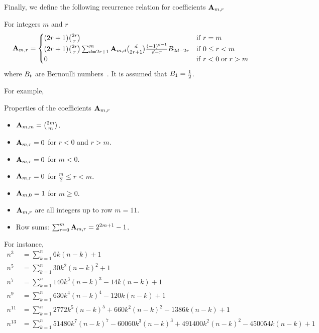 Finally, we define the following recurrence relation for coefficients ${\mathbf{A}} \sb{m,r}$
\begin{proposition}
    For integers $m$ and $r$
    \label{prop:coefficients_a}
    \begin{align*}
        {\mathbf{A}} \sb{m,r} =
        \begin{cases}
        (2r+1)
            \binom{2r}{r} & \mathrm{if} \; r=m \\
            (2r+1) \binom{2r}{r} \sum_{d = 2r+1}^{m} {\mathbf{A}} \sb{m,d} \binom{d}{2r+1} \frac{(-1)^{d-1}}{d-r}
            {B}\sb{2d-2r} & \mathrm{if} \; 0 \leq r<m \\
            0 & \mathrm{if} \; r<0 \; \mathrm{or} \; r>m
        \end{cases}
    \end{align*}
    where ${B}\sb{t}$ are Bernoulli numbers~\cite{bateman1953higher}.
    It is assumed that ${B}\sb{1}=\frac{1}{2}$.
\end{proposition}
For example,

Properties of the coefficients ${\mathbf{A}} \sb{m,r}$
\begin{itemize}
    \item ${\mathbf{A}} \sb{m,m} = \binom{2m}{m}$.
    \item ${\mathbf{A}} \sb{m,r} = 0$ for $r < 0$ and $r > m$.
    \item ${\mathbf{A}} \sb{m,r} = 0$ for $m < 0$.
    \item ${\mathbf{A}} \sb{m,r} = 0$ for $\frac{m}{2} \leq r < m$.
    \item ${\mathbf{A}} \sb{m,0} = 1$ for $m \geq 0$.
    \item ${\mathbf{A}} \sb{m,r}$ are all integers up to row $m = 11$.
    \item Row sums: $\sum_{r=0}^{m} {\mathbf{A}} \sb{m,r} = 2^{2m+1} - 1$.
\end{itemize}
For instance,
\begin{align*}
    n^3 &= \sum_{k=1}^{n} 6k(n-k) + 1 \\
    n^5 &= \sum_{k=1}^{n} 30k^2(n-k)^2 + 1 \\
    n^7 &= \sum_{k=1}^{n} 140 k^3 (n-k)^3 - 14k(n-k) + 1 \\
    n^9 &= \sum_{k=1}^{n} 630 k^4(n-k)^4 - 120k(n-k) + 1 \\
    n^{11} &= \sum_{k=1}^{n} 2772 k^5(n-k)^5 + 660 k^2(n-k)^2 - 1386k(n-k) + 1 \\
    n^{13} &= \sum_{k=1}^{n} 51480 k^7(n-k)^7 - 60060 k^3(n-k)^3 + 491400k^2(n-k)^{2} - 450054k(n-k) + 1
\end{align*}
